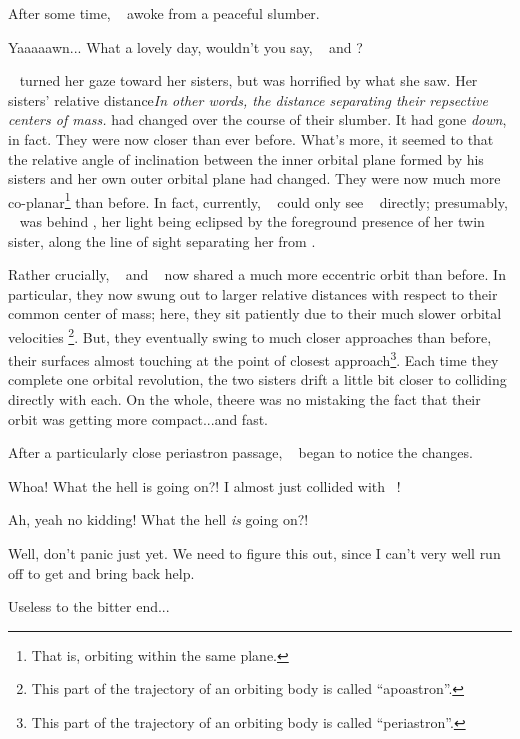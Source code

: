 \documentclass[main.tex]{subfiles}
\begin{document}
\newpara \nar After some time, \rmcelaeno~ awoke from a peaceful slumber.  

\newpara \Celaeno Yaaaaawn... What a lovely day, wouldn't you say, \rmtaygete~ and \rmalcyone?

\newpara \nar \rmcelaeno~ turned her gaze toward her sisters, but was horrified by what she saw.  Her sisters' relative distance\textit{In other words, the distance separating their repsective centers of mass.} had changed over the course of their slumber.  It had gone \textit{down}, in fact.  They were now closer than ever before.  What's more, it seemed to \rmcelaeno that the relative angle of inclination between the inner orbital plane formed by his sisters and her own outer orbital plane had changed.  They were now much more co-planar\footnote{That is, orbiting within the same plane.} than before.  In fact, currently, \rmcelaeno~ could only see \rmalcyone~ directly; presumably, \rmtaygete~ was behind \rmalcyone, her light being eclipsed by the foreground presence of her twin sister, along the line of sight separating her from \rmcelaeno.

\newpara \nar Rather crucially, \rmtaygete~ and \rmalcyone~ now shared a much more eccentric orbit than before.  In particular, they now swung out to larger relative distances with respect to their common center of mass; here, they sit patiently due to their much slower orbital velocities \footnote{This part of the trajectory of an orbiting body is called ``apoastron''.}.  But, they eventually swing to much closer approaches than before, their surfaces almost touching at the point of closest approach\footnote{This part of the trajectory of an orbiting body is called ``periastron''.}.  Each time they complete one orbital revolution, the two sisters drift a little bit closer to colliding directly with each.  On the whole, theere was no mistaking the fact that their orbit was getting more compact...and fast.

\newpara \nar After a particularly close periastron passage, \rmtaygete~ began to notice the changes.

\newpara \Taygete  Whoa!  What the hell is going on?!  I almost just collided with \rmalcyone~!

\newpara \Alcyone Ah, yeah no kidding!  What the hell \textit{is} going on?!

\newpara \Celaeno  Well, don't panic just yet.  We need to figure this out, since I can't very well run off to get and bring back help.

\newpara \Alcyone Useless to the bitter end...
\end{document}

